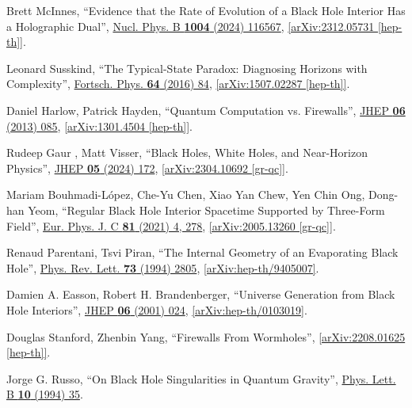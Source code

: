 \documentclass[12pt,preprintnumbers, floatfix, preprintnumbers, letterpaper, superscriptaddress,nofootinbib]{revtex4-2}
\begin{document}
\begin{thebibliography}{99}
Brett McInnes, ``Evidence that the Rate of Evolution of a Black Hole Interior Has a Holographic Dual'', {\href{https://www.sciencedirect.com/science/article/pii/S0550321324001330}{Nucl. Phys. B \textbf{1004} (2024) 116567}}, \href{https://arxiv.org/abs/2312.05731}{[arXiv:2312.05731 [hep-th]]}.

Leonard Susskind, ``The Typical-State Paradox: Diagnosing Horizons with Complexity'', {\href{https://onlinelibrary.wiley.com/doi/10.1002/prop.201500091}{Fortsch. Phys. \textbf{64} (2016) 84}}, \href{https://arxiv.org/abs/1507.02287}{[arXiv:1507.02287 [hep-th]]}.

Daniel Harlow, Patrick Hayden, ``Quantum Computation vs. Firewalls'',  {\href{https://link.springer.com/article/10.1007/JHEP06(2013)085}{JHEP \textbf{06} (2013) 085}}, \href{https://arxiv.org/abs/1301.4504}{[arXiv:1301.4504 [hep-th]]}.

Rudeep Gaur , Matt Visser, ``Black Holes, White Holes, and Near-Horizon Physics'', {\href{https://doi.org/10.1007/JHEP05(2024)172}{JHEP \textbf{05} (2024) 172}}, \href{https://arxiv.org/abs/2304.10692}{[arXiv:2304.10692 [gr-qc]]}.

Mariam Bouhmadi-López, Che-Yu Chen, Xiao Yan Chew, Yen Chin Ong, Dong-han Yeom, ``Regular Black Hole Interior Spacetime Supported by Three-Form Field'', {\href{https://link.springer.com/article/10.1140/epjc/s10052-021-09080-1}{Eur. Phys. J. C \textbf{81} (2021) 4, 278}}, \href{https://arxiv.org/abs/2005.13260}{[arXiv:2005.13260 [gr-qc]]}.

Renaud Parentani, Tsvi Piran, ``The Internal Geometry of an Evaporating Black Hole'', {\href{https://journals.aps.org/prl/abstract/10.1103/PhysRevLett.73.2805}{Phys. Rev. Lett. \textbf{73} (1994) 2805}}, \href{https://arxiv.org/abs/hep-th/9405007v2}{[arXiv:hep-th/9405007]}.

Damien A. Easson, Robert H. Brandenberger, ``Universe Generation from Black Hole Interiors'', {\href{https://iopscience.iop.org/article/10.1088/1126-6708/2001/06/024}{JHEP \textbf{06} (2001) 024}}, \href{https://arxiv.org/abs/hep-th/0103019}{[arXiv:hep-th/0103019]}.

Douglas Stanford, Zhenbin Yang, ``Firewalls From Wormholes'', \href{https://arxiv.org/abs/2208.01625}{[arXiv:2208.01625 [hep-th]]}.

Jorge G. Russo, ``On Black Hole Singularities in Quantum Gravity'', {\href{https://www.sciencedirect.com/science/article/abs/pii/0370269394911290}{Phys. Lett. B \textbf{10} (1994) 35}}.


\end{thebibliography}
\end{document}

